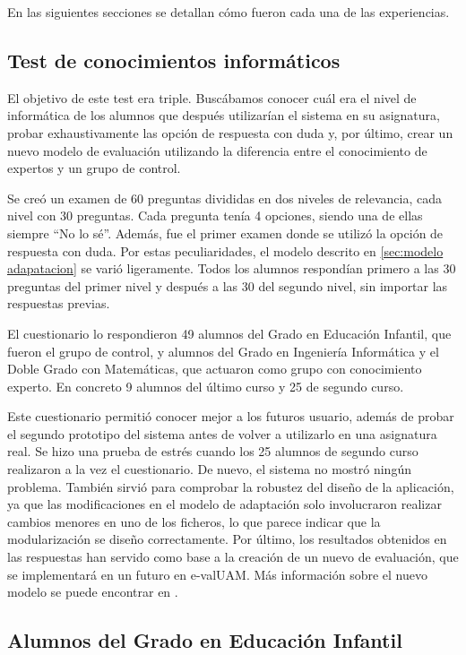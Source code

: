 En las siguientes secciones se detallan cómo fueron cada una de las experiencias.

\subsection{Test de conocimientos informáticos}

El objetivo de este test era triple. Buscábamos conocer cuál era el nivel de informática de los alumnos que después utilizarían el sistema en su asignatura, probar exhaustivamente las opción de respuesta con duda y, por último, crear un nuevo modelo de evaluación utilizando la diferencia entre el conocimiento de expertos y un grupo de control.

Se creó un examen de 60 preguntas divididas en dos niveles de relevancia, cada nivel con 30 preguntas. Cada pregunta tenía 4 opciones, siendo una de ellas siempre ``No lo sé''. Además, fue el primer examen donde se utilizó la opción de respuesta con duda. Por estas peculiaridades, el modelo descrito en \ref{sec:modelo adapatacion} se varió ligeramente. Todos los alumnos respondían primero a las 30 preguntas del primer nivel y después a las 30 del segundo nivel, sin importar las respuestas previas.

El cuestionario lo respondieron 49 alumnos del Grado en Educación Infantil, que fueron el grupo de control, y alumnos del Grado en Ingeniería Informática y el Doble Grado con Matemáticas, que actuaron como grupo con conocimiento experto. En concreto 9 alumnos del último curso y 25 de segundo curso.

Este cuestionario permitió conocer mejor a los futuros usuario, además de probar el segundo prototipo del sistema antes de volver a utilizarlo en una asignatura real. Se hizo una prueba de estrés cuando los 25 alumnos de segundo curso realizaron a la vez el cuestionario. De nuevo, el sistema no mostró ningún problema. También sirvió para comprobar la robustez del diseño de la aplicación, ya que las modificaciones en el modelo de adaptación solo involucraron realizar cambios menores en uno de los ficheros, lo que parece indicar que la modularización se diseño correctamente. Por último, los resultados obtenidos en las respuestas han servido como base a la creación de un nuevo de evaluación, que se implementará en un futuro en e-valUAM. Más información sobre el nuevo modelo se puede encontrar en \cite{Molins15}.

\subsection{Alumnos del Grado en Educación Infantil}


